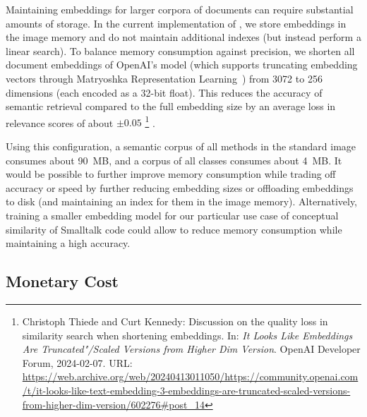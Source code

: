Maintaining embeddings for larger corpora of documents can require substantial amounts of storage.
In the current implementation of \semtex, we store embeddings in the image memory and do not maintain additional indexes (but instead perform a linear search).
To balance memory consumption against precision, we shorten all document embeddings of OpenAI's  model (which supports truncating embedding vectors through Matryoshka Representation Learning~\cite{kusupati2024matryoshka}) from 3072 to 256 dimensions (each encoded as a 32-bit float).
This reduces the accuracy of semantic retrieval compared to the full embedding size by an average loss in relevance scores of about $\pm 0.05$%
\footnote{Christoph Thiede and Curt Kennedy: Discussion on the quality loss in similarity search when shortening embeddings. In: \emph{It Looks Like  Embeddings Are Truncated"/Scaled Versions from Higher Dim Version}. OpenAI Developer Forum, 2024-02-07. URL: \url{https://web.archive.org/web/20240413011050/https://community.openai.com/t/it-looks-like-text-embedding-3-embeddings-are-truncated-scaled-versions-from-higher-dim-version/602276\#post_14}}%
.

Using this configuration, a semantic corpus of all methods in the standard image consumes about \qty{90}{MB}, and a corpus of all classes consumes about \qty{4}{MB}.
It would be possible to further improve memory consumption while trading off accuracy or speed by further reducing embedding sizes or offloading embeddings to disk (and maintaining an index for them in the image memory).
Alternatively, training a smaller embedding model for our particular use case of conceptual similarity of Smalltalk code could allow to reduce memory consumption while maintaining a high accuracy.

\subsection{Monetary Cost}
\label{sec:discussion/performance/money}


